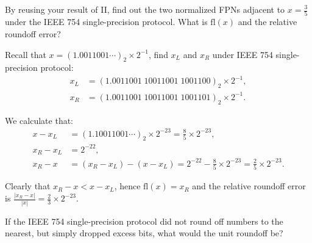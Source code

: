 \documentclass[11pt]{elegantbook}
\begin{document}
\vspace{1em}

\begin{problem}
  By reusing your result of II, find out the two normalized FPNs adjacent to $x=\frac{3}{5}$ under the IEEE 754 single-precision protocol. What is $\text{fl}(x)$ and the relative roundoff error?
\end{problem}

\begin{solution}
  Recall that $x=(1.0011001\cdots)_2\times 2^{-1}$, find $x_L$ and $x_R$ under IEEE 754 single-precision protocol:
  \begin{align*}
    x_L &= (1.0011001\;10011001\;1001100)_2\times 2^{-1},\\
    x_R &= (1.0011001\;10011001\;1001101)_2\times 2^{-1}.
  \end{align*}

  We calculate that:
  \begin{align*}
    x-x_L &= (1.10011001\cdots)_2\times 2^{-23}=\frac{8}{5} \times 2^{-23},\\
    x_R-x_L &= 2^{-22},\\
    x_R-x&=(x_R-x_L)-(x-x_L)=2^{-22}-\frac{8}{5} \times 2^{-23}=\frac{2}{5}\times 2^{-23}.
  \end{align*}

  Clearly that $x_R-x<x-x_L$, hence $\text{fl}(x)=x_R$ and the relative roundoff error is $\frac{|x_R-x|}{|x|}=\frac{2}{3}\times 2^{-23}$.
\end{solution}

\begin{problem}
  If the IEEE 754 single-precision protocol did not round off numbers to the nearest, but simply dropped excess bits, what would the unit roundoff be?
\end{problem}
\end{document}
